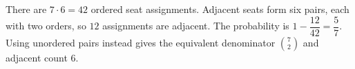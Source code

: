 There are $7\cdot6=42$ ordered seat assignments. Adjacent seats form six pairs, each with two orders, so $12$ assignments are adjacent. The probability is $1-\dfrac{12}{42}=\boxed{\dfrac{5}{7}}$. Using unordered pairs instead gives the equivalent denominator $\binom72$ and adjacent count $6$.
